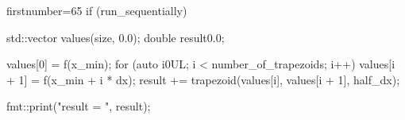 \begin{cppcode*}{firstnumber=65}
    if (run_sequentially) {
      std::vector values(size, 0.0);
      double result{0.0};

      values[0] = f(x_min);
      for (auto i{0UL}; i < number_of_trapezoids; i++) {
        values[i + 1] = f(x_min + i * dx);
        result += 
          trapezoid(values[i], values[i + 1], half_dx);
      }

      fmt::print("result = {}\n", result);
    }
\end{cppcode*}






